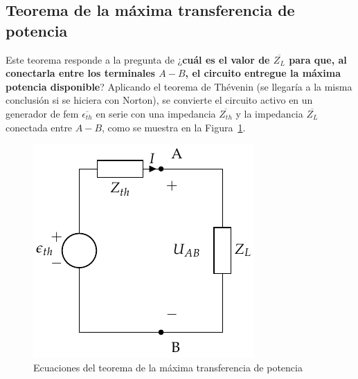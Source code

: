 \documentclass[11pt]{book} %
\begin{document}
\subsection{Teorema de la máxima transferencia de potencia}
Este teorema responde a la pregunta de ¿\textbf{cuál es el valor de $\overline{Z_L}$ para que, al conectarla entre los terminales $A-B$, el circuito entregue la máxima potencia disponible}? Aplicando el teorema de Thévenin (se llegaría a la misma conclusión si se hiciera con Norton), se convierte el circuito activo en un generador de fem $\overline{\epsilon_{th}}$ en serie con una impedancia $\overline{Z_{th}}$ y la impedancia $\overline{Z_L}$ conectada entre $A-B$, como se muestra en la Figura~\ref{fig.equivalenteThevenin0_ca}. 
\begin{figure}[htbp]
    \centering
    \includegraphics{../figs/EquivalenteThevenin0.pdf}
    \caption{Ecuaciones del teorema de la máxima transferencia de potencia}
    \label{fig.equivalenteThevenin0_ca}
\end{figure}
\end{document}
